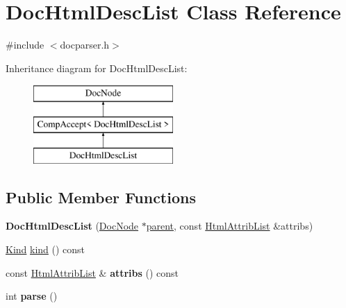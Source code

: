 \hypertarget{class_doc_html_desc_list}{}\section{Doc\+Html\+Desc\+List Class Reference}
\label{class_doc_html_desc_list}


{\ttfamily \#include $<$docparser.\+h$>$}

Inheritance diagram for Doc\+Html\+Desc\+List\+:\begin{figure}[H]
\begin{center}
\leavevmode
\includegraphics[height=3.000000cm]{class_doc_html_desc_list}
\end{center}
\end{figure}
\subsection*{Public Member Functions}
\begin{DoxyCompactItemize}
\item 
\mbox{\label{class_doc_html_desc_list_accd23dc4f88dc9b9831a176f9f10c1f3}} 
{\bfseries Doc\+Html\+Desc\+List} (\mbox{\hyperlink{class_doc_node}{Doc\+Node}} $\ast$\mbox{\hyperlink{class_doc_node_a73e8ad29a91cfceb0968eb00db71a23d}{parent}}, const \mbox{\hyperlink{class_html_attrib_list}{Html\+Attrib\+List}} \&attribs)
\item 
\mbox{\hyperlink{class_doc_node_aebd16e89ca590d84cbd40543ea5faadb}{Kind}} \mbox{\hyperlink{class_doc_html_desc_list_a40585d9cdce7ed41801664787ff5fbb1}{kind}} () const
\item 
\mbox{\label{class_doc_html_desc_list_afc4d3cdcde5bc46ae09c07d1e931bd6f}} 
const \mbox{\hyperlink{class_html_attrib_list}{Html\+Attrib\+List}} \& {\bfseries attribs} () const
\item 
\mbox{\label{class_doc_html_desc_list_a9873174137ece02520433d67717de09a}} 
int {\bfseries parse} ()
\end{DoxyCompactItemize}
